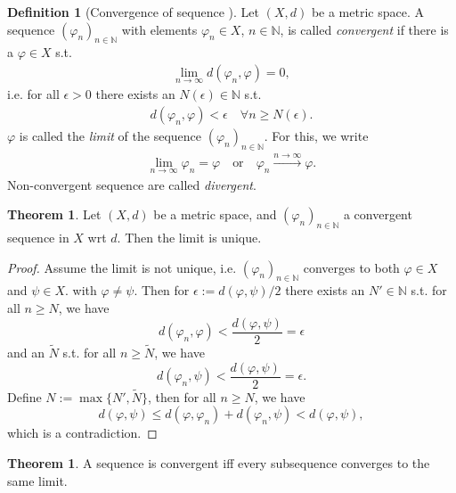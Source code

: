 \documentclass[12pt, a4paper]{article}
\numberwithin{equation}{section}
\theoremstyle{definition}
\theoremstyle{definition}
\newtheorem{defn}[thm]{Definition} %
\newtheorem{theorem}[thm]{Theorem}
\newcommand{\seq}[1][\varphi]{\left( #1 \right)_{n \in \mathbb{N}}}
\begin{document}
	\begin{defn}[Convergence of sequence \cite{fa2019}]\label{defn:convergence_sequence}
		Let $(X, d)$ be a metric space. A sequence $(\varphi_n)_{n\in\mathbb N}$ with elements $\varphi_n\in X$, $n\in\mathbb N$, is called \textit{convergent} if there is a $\varphi\in X$ s.t.
		\begin{align}
			\lim\limits_{n\to\infty}d(\varphi_n, \varphi) = 0,
		\end{align}
		i.e. for all $\epsilon > 0$ there exists an $N(\epsilon)\in\mathbb N$ s.t.
		\begin{align}
			d(\varphi_n, \varphi) < \epsilon \quad \forall n\geq N(\epsilon).
		\end{align}
		$\varphi$ is called the \textit{limit} of the sequence $(\varphi_n)_{n\in \mathbb N}$. For this, we write 
		\begin{align}
			\lim\limits_{n\to\infty}\varphi_n = \varphi \quad \text{or}\quad \varphi_n \overset{n \to\infty}{\longrightarrow} \varphi.
		\end{align}
		Non-convergent sequence are called \textit{divergent}.
	\end{defn}

	\begin{theorem}\label{thrm:sequences_unique_limits}
		Let $(X, d)$ be a metric space, and $\seq[\varphi_n]$ a convergent sequence in $X$ wrt $d$. Then the limit is unique.
	\end{theorem}

	\begin{proof}
		Assume the limit is not unique, i.e. $\seq[\varphi_n]$ converges to both $\varphi\in X$ and $\psi\in X$. with $\varphi\ne\psi$. Then for $\epsilon := d(\varphi, \psi) / 2$ there exists an $N'\in\mathbb N$ s.t. for all $n\geq N$, we have
		$$d(\varphi_n, \varphi) < \frac{d(\varphi, \psi)}{2} = \epsilon$$ 
		and an $\tilde{N}$ s.t. for all $n\geq \tilde{N}$, we have
		$$d(\varphi_n, \psi) < \frac{d(\varphi, \psi)}{2} = \epsilon.$$
		Define $N := \max\{N', \tilde{N}\}$, then for all $n\geq N$, we have
		$$d(\varphi, \psi) \leq d(\varphi, \varphi_n) + d(\varphi_n, \psi) < d(\varphi, \psi),$$
		which is a contradiction.
	\end{proof}

	\begin{theorem}\label{thrm:seq_convergence_subsequences}
		A sequence is convergent iff every subsequence converges to the same limit.
	\end{theorem}
	
\end{document}
